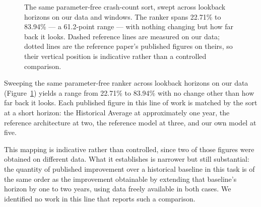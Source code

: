 \documentclass[conference]{IEEEtran}
\begin{document}
\begin{figure}[t]
\caption{The same parameter-free crash-count sort, swept across lookback
horizons on our data and windows. The ranker spans 22.71\% to 83.94\% —
a 61.2-point range — with nothing changing but how far back it looks.
Dashed reference lines are measured on our data; dotted lines are the
reference paper's published figures on theirs, so their vertical position
is indicative rather than a controlled comparison.}
\label{fig:horizon}
\end{figure}

Sweeping the same parameter-free ranker across lookback horizons on our
data (Figure~\ref{fig:horizon}) yields a range from 22.71\% to 83.94\%
with no change other than how far back it looks. Each published figure in
this line of work is matched by the sort at a short horizon: the
Historical Average at approximately one year, the reference architecture
at two, the reference model at three, and our own model at five.

This mapping is indicative rather than controlled, since two of those
figures were obtained on different data. What it establishes is narrower
but still substantial: the quantity of published improvement over a
historical baseline in this task is of the same order as the improvement
obtainable by extending that baseline's horizon by one to two years, using
data freely available in both cases. We identified no work in this line
that reports such a comparison.
\end{document}
